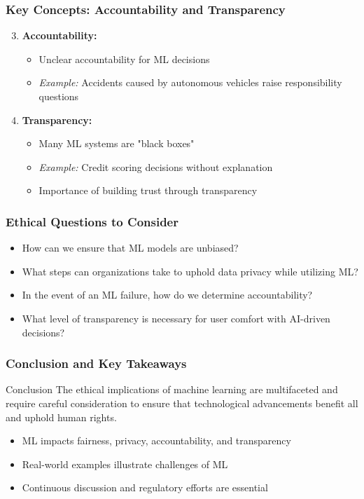 \documentclass[aspectratio=169]{beamer}
\begin{document}
\begin{frame}[fragile]
    \frametitle{Key Concepts: Accountability and Transparency}
    \begin{enumerate}
        \setcounter{enumi}{2}
        \item \textbf{Accountability:}
        \begin{itemize}
            \item Unclear accountability for ML decisions
            \item \textit{Example:} Accidents caused by autonomous vehicles raise responsibility questions
        \end{itemize}
        
        \item \textbf{Transparency:}
        \begin{itemize}
            \item Many ML systems are "black boxes"
            \item \textit{Example:} Credit scoring decisions without explanation
            \item Importance of building trust through transparency
        \end{itemize}
    \end{enumerate}
\end{frame}

\begin{frame}[fragile]
    \frametitle{Ethical Questions to Consider}
    \begin{itemize}
        \item How can we ensure that ML models are unbiased?
        \item What steps can organizations take to uphold data privacy while utilizing ML?
        \item In the event of an ML failure, how do we determine accountability?
        \item What level of transparency is necessary for user comfort with AI-driven decisions?
    \end{itemize}
\end{frame}

\begin{frame}[fragile]
    \frametitle{Conclusion and Key Takeaways}
    \begin{block}{Conclusion}
        The ethical implications of machine learning are multifaceted and require careful consideration to ensure that technological advancements benefit all and uphold human rights.
    \end{block}
    \begin{itemize}
        \item ML impacts fairness, privacy, accountability, and transparency
        \item Real-world examples illustrate challenges of ML
        \item Continuous discussion and regulatory efforts are essential
    \end{itemize}
\end{frame}
\end{document}
